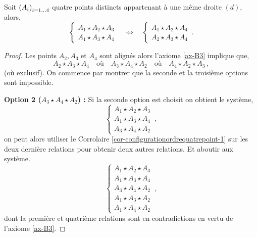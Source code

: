\begin{cor}\label{cor-configurationordrequatrepoint-3}
    Soit $\left(A_{i}\right)_{i = 1\ldots 4}$ quatre points distincts appartenant à une même droite $(d)$, alors,
    \begin{equation*}
        \left\{
            \begin{array}{c}
                 A_1 \star A_2 \star A_3 \\
                 A_1 \star A_3 \star A_4
            \end{array}
            \right. \quad \Longleftrightarrow \quad \left\{
            \begin{array}{c}
                A_1 \star A_2 \star A_4\\
                A_2 \star A_3 \star A_4
            \end{array}
            \right.
            \,.
    \end{equation*}
    \begin{proof}
        Les points $A_2,A_3$ et $A_4$ sont alignés alors l'axiome \ref{ax-B3} implique que,
        \begin{equation*}
            A_2 \star A_3 \star A_4 \quad\text{où}\quad A_3 \star A_4 \star A_2 \quad\text{où}\quad A_4 \star A_2 \star A_3 \,,
        \end{equation*}
        (où exclusif). On commence par montrer que la seconde et la troisième options sont impossible. 
        
        \textbf{Option 2 ($A_3 \star A_4 \star A_2$) :}  Si la seconde option est choisit on obtient le système,
        \begin{equation*}
        \left\{
            \begin{array}{c}
                 A_1 \star A_2 \star A_3 \\
                 A_1 \star A_3 \star A_4 \\
                 A_3 \star A_4 \star A_2 
            \end{array}
            \right. \,,
        \end{equation*}
        on peut alors utiliser le Corrolaire \ref{cor-configurationordrequatrepoint-1} sur les deux dernière relations pour obtenir deux autres relations. Et aboutir aux système.
        \begin{equation*}
        \left\{
            \begin{array}{c}
                 A_1 \star A_2 \star A_3 \\
                 A_1 \star A_3 \star A_4 \\
                 A_3 \star A_4 \star A_2 \\
                 A_1 \star A_3 \star A_2 \\
                 A_1 \star A_4 \star A_2 
            \end{array}
            \right. \,,
        \end{equation*}
        dont la première et quatrième relations sont en contradictions en vertu de l'axiome \ref{ax-B3}.


\end{proof}
\end{cor}

